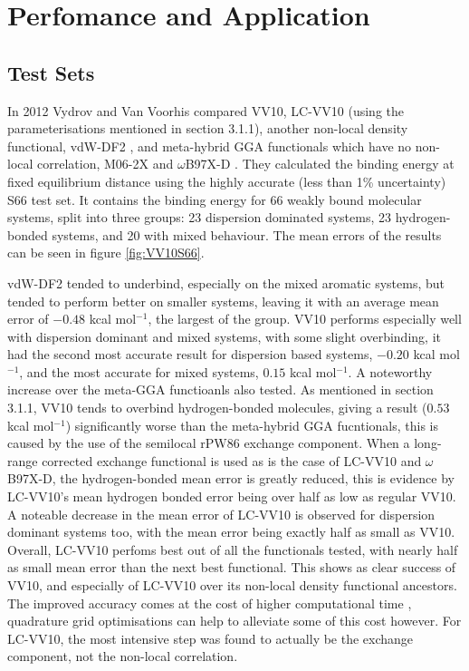 \documentclass[10pt,a4paper,twocolumn,twoside]{extarticle}
\newcommand{\kcal}{kcal mol\(^{-1}\)}
\begin{document}
	\section{Perfomance and Application}
	\subsection{Test Sets}
	In 2012 Vydrov and Van Voorhis compared VV10, LC-VV10 (using the parameterisations mentioned in section 3.1.1), another non-local density functional, vdW-DF2 \cite{Lee2010-vdW-DF2-Original}, and meta-hybrid GGA functionals which have no non-local correlation, M06-2X \cite{M06-2X} and $\omega$B97X-D \cite{B97X-D}. They calculated the binding energy at fixed equilibrium distance using the highly accurate (less than 1\% uncertainty) S66\cite{s66a, s66b} test set. It contains the binding energy for 66 weakly bound molecular systems, split into three groups: 23 dispersion dominated systems, 23 hydrogen-bonded systems, and 20 with mixed behaviour. The mean errors of the results can be seen in figure \ref{fig:VV10S66}.

	vdW-DF2 tended to underbind, especially on the mixed aromatic systems, but tended to perform better on smaller systems, leaving it with an average mean error of $-0.48$ \kcal, the largest of the group. VV10 performs especially well with dispersion dominant and mixed systems, with some slight overbinding, it had the second most accurate result for dispersion based systems, $-0.20$ \kcal, and the most accurate for mixed systems, $0.15$ \kcal. A noteworthy increase over the meta-GGA functioanls also tested. As mentioned in section 3.1.1, VV10 tends to overbind hydrogen-bonded molecules, giving a result ($0.53$ \kcal) significantly worse than the meta-hybrid GGA fucntionals, this is caused by the use of the semilocal rPW86 exchange component. When a long-range corrected exchange functional is used as is the case of LC-VV10 and $\omega$B97X-D, the hydrogen-bonded mean error is greatly reduced, this is evidence by LC-VV10's mean hydrogen bonded error being over half as low as regular VV10. 
	A noteable decrease in the mean error of LC-VV10 is observed for dispersion dominant systems too, with the mean error being exactly half as small as VV10. Overall, LC-VV10 perfoms best out of all the functionals tested, with nearly half as small mean error than the next best functional. This shows as clear success of VV10, and especially of LC-VV10 over its non-local density functional ancestors. The improved accuracy comes at the cost of higher computational time \cite{vydrov2008-vdw-comparisons}, quadrature grid optimisations can help to alleviate some of this cost however. For LC-VV10, the most intensive step was found to actually be the exchange component, not the non-local correlation.
\end{document}

